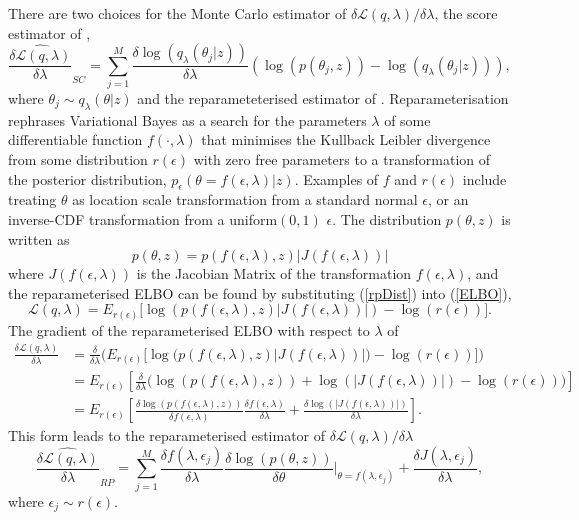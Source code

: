 \documentclass[12pt,a4paper]{article}\usepackage[]{graphicx}\usepackage[]{color}
\begin{document}
There are two choices for the Monte Carlo estimator of $\delta\mathcal{L}(q, \lambda) / \delta \lambda$, the score estimator of \citet{Ranganath2014}, 
\begin{equation}
\label{scoreDeriv}
\widehat{\frac{\delta\mathcal{L}(q, \lambda)}{\delta \lambda}}_{SC} = \sum_{j = 1}^M \frac{\delta \log(q_{\lambda}(\theta_j | z))}{\delta \lambda} \left(\log(p(\theta_j, z)) - \log(q_{\lambda}(\theta_j | z)) \right),
\end{equation}
where $\theta_j \sim q_{\lambda}(\theta | z)$ and the reparameteterised estimator of \citet{Kingma2014}. Reparameterisation rephrases Variational Bayes as a search for the parameters $\lambda$ of some differentiable function $f(\cdot, \lambda)$ that minimises the Kullback Leibler divergence from some distribution $r(\epsilon)$ with zero free parameters to a transformation of the posterior distribution, $p_{\epsilon}(\theta = f(\epsilon, \lambda) | z)$. Examples of $f$ and $r(\epsilon)$ include treating $\theta$ as location scale transformation from a standard normal $\epsilon$, or an inverse-CDF transformation from a uniform$(0, 1)$ $\epsilon$. The distribution $p(\theta, z)$ is written as
\begin{equation}
\label{rpDist}
p(\theta, z) = p(f(\epsilon, \lambda), z)|J(f(\epsilon, \lambda))|
\end{equation}
where $J(f(\epsilon, \lambda))$ is the Jacobian Matrix of the transformation $f(\epsilon, \lambda)$, and the reparameterised ELBO can be found by substituting (\ref{rpDist}) into (\ref{ELBO}),
\begin{equation}
\label{rpELBO}
\mathcal{L}(q, \lambda) = E_{r(\epsilon)} \bigg[\log(p(f(\epsilon,\lambda), z)|J(f(\epsilon, \lambda))|) - \log(r(\epsilon))\bigg].
\end{equation}
The gradient of the reparameterised ELBO with respect to $\lambda$ of 
\begin{align}
\label{rpELBODeriv}
\frac{\delta\mathcal{L}(q, \lambda)}{\delta \lambda} &= \frac{\delta}{\delta \lambda} \bigg( E_{r(\epsilon)} \bigg[\log\big(p(f(\epsilon,\lambda), z)|J(f(\epsilon, \lambda))|\big) - \log(r(\epsilon))\bigg] \bigg) \nonumber \\
&= E_{r(\epsilon)} \left[ \frac{\delta}{\delta \lambda} \bigg(\log(p(f(\epsilon,\lambda), z)) + \log(|J(f(\epsilon, \lambda))|) - \log(r(\epsilon)) \bigg)\right] \nonumber \\
&= E_{r(\epsilon)} \left[ \frac{\delta \log(p(f(\epsilon,\lambda), z))}{\delta f(\epsilon,\lambda)} \frac{\delta f(\epsilon,\lambda)}{\delta \lambda}  + \frac{\delta \log(|J(f(\epsilon, \lambda))|)}{\delta \lambda} \right].
\end{align}
This form leads to the reparameterised estimator of $\delta\mathcal{L}(q, \lambda) / \delta \lambda$
\begin{equation}
\label{rpDeriv}
\widehat{\frac{\delta\mathcal{L}(q, \lambda)}{\delta \lambda}}_{RP} = \sum_{j = 1}^M \frac{\delta f(\lambda, \epsilon_j)}{\delta \lambda} \frac{\delta \log(p(\theta, z))}{\delta \theta} \bigg\rvert_{\theta = f(\lambda, \epsilon_j)} + \frac{\delta J(\lambda, \epsilon_j)}{\delta \lambda}, 
\end{equation}
where $\epsilon_j \sim r(\epsilon)$.
\end{document}

